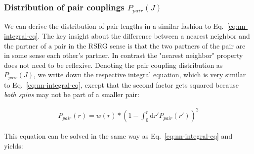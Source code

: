 \subsubsection{Distribution of pair couplings $P_{pair}(J)$}
We can derive the distribution of pair lengths in a similar fashion to Eq.~\ref{eq:nn-integral-eq}. The key insight about the difference between a nearest neighbor and the partner of a pair in the RSRG sense is that the two partners of the pair are in some sense each other's partner. In contrast the "nearest neighbor" property does not need to be reflexive. Denoting the pair coupling distribution as $P_{pair}(J)$, we write down the respective integral equation, which is very similar to Eq.~\ref{eq:nn-integral-eq}, except that the second factor gets squared because \emph{both spins} may not be part of a smaller pair:

\begin{align}\label{eq:pair-integral-eq}
	P_{pair}(r) = w(r)*\left(1-\int_0^r \mathrm{d}r' P_{pair}(r')\right)^2
\end{align}

%

This equation can be solved in the same way as Eq.~\ref{eq:nn-integral-eq} and yields:


